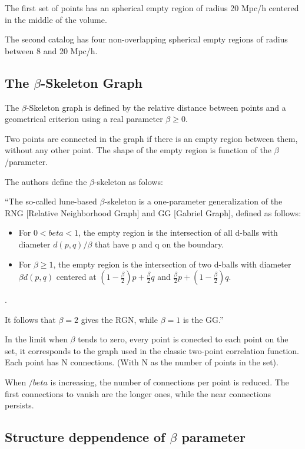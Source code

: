 \documentclass[preprint]{aastex62}
\begin{document}
The first set of points has an spherical empty region of radius
20 Mpc/h centered in the middle of the volume.

The second catalog has four non-overlapping spherical empty
regions of radius between 8 and 20 Mpc/h.


\subsection{The $\beta$-Skeleton Graph}

The $\beta$-Skeleton graph is defined by the relative distance
between points and a geometrical criterion using a real
parameter $\beta\geq 0$.

Two points are connected in the graph if there is an empty region
between them, without any other point. The shape of the empty region
is function of the $\beta$/parameter.

The authors define the $\beta$-skeleton as folows:

``The so-called lune-based $\beta$-skeleton is a one-parameter
generalization of the RNG [Relative Neighborhood Graph] and
GG [Gabriel Graph], defined as follows:

\begin{itemize}
\item For $0<beta<1$, the empty region is the intersection of all
  d-balls with diameter $d(p,q) / \beta$ that have p and q on the
  boundary.
\item For $\beta \geq 1$, the empty region is the intersection of
  two d-balls with diameter $\beta d(p,q)$ centered at
  $(1-\frac{\beta}{2})p + \frac{\beta}{2}q$ and
  $\frac{\beta}{2}p + (1-\frac{\beta}{2})q$.
\end{itemize}.

It follows that $\beta = 2$ gives the RGN, while $\beta = 1$ is
the GG.''
  
In the limit when $\beta$ tends to zero, every point is conected
to each point on the set, it corresponds to the graph used in
the classic two-point correlation function. Each point has N
connections. (With N as the number of points in the set).

When $/beta$ is increasing, the number of connections per point
is reduced. The first connections to vanish are the longer ones,
while the near connections persists.

\subsection{Structure deppendence of $\beta$ parameter}
\end{document}
